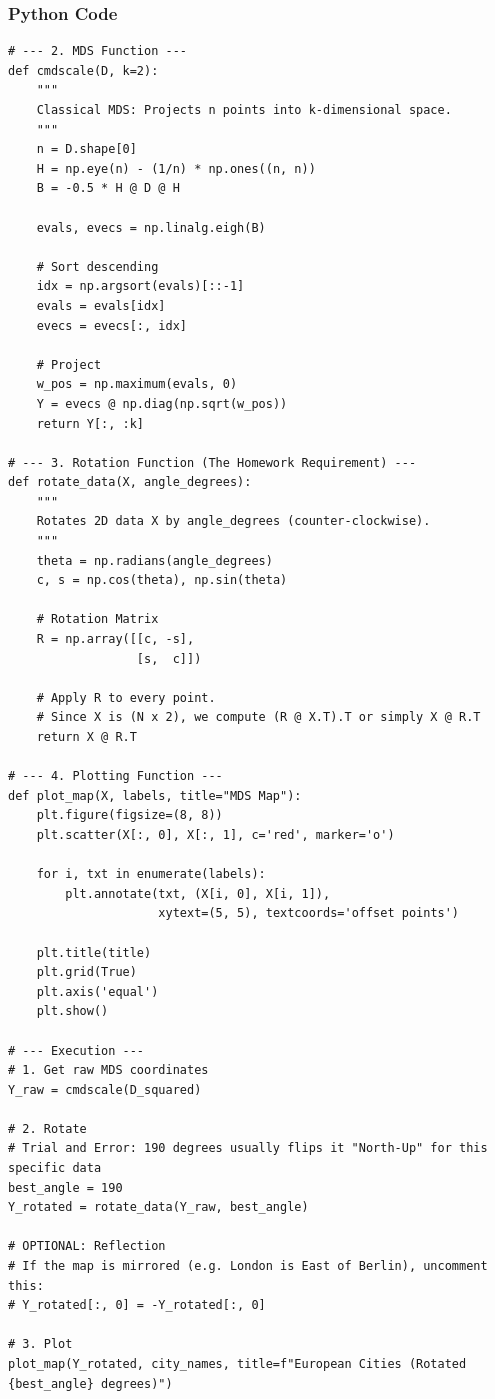 \documentclass{article}
\begin{document}
\subsubsection*{Python Code}
\begin{lstlisting}
# --- 2. MDS Function ---
def cmdscale(D, k=2):
    """
    Classical MDS: Projects n points into k-dimensional space.
    """
    n = D.shape[0]
    H = np.eye(n) - (1/n) * np.ones((n, n))
    B = -0.5 * H @ D @ H
    
    evals, evecs = np.linalg.eigh(B)
    
    # Sort descending
    idx = np.argsort(evals)[::-1]
    evals = evals[idx]
    evecs = evecs[:, idx]
    
    # Project
    w_pos = np.maximum(evals, 0)
    Y = evecs @ np.diag(np.sqrt(w_pos))
    return Y[:, :k]

# --- 3. Rotation Function (The Homework Requirement) ---
def rotate_data(X, angle_degrees):
    """
    Rotates 2D data X by angle_degrees (counter-clockwise).
    """
    theta = np.radians(angle_degrees)
    c, s = np.cos(theta), np.sin(theta)
    
    # Rotation Matrix
    R = np.array([[c, -s], 
                  [s,  c]])
    
    # Apply R to every point. 
    # Since X is (N x 2), we compute (R @ X.T).T or simply X @ R.T
    return X @ R.T

# --- 4. Plotting Function ---
def plot_map(X, labels, title="MDS Map"):
    plt.figure(figsize=(8, 8))
    plt.scatter(X[:, 0], X[:, 1], c='red', marker='o')
    
    for i, txt in enumerate(labels):
        plt.annotate(txt, (X[i, 0], X[i, 1]), 
                     xytext=(5, 5), textcoords='offset points')
        
    plt.title(title)
    plt.grid(True)
    plt.axis('equal')
    plt.show()

# --- Execution ---
# 1. Get raw MDS coordinates
Y_raw = cmdscale(D_squared)

# 2. Rotate
# Trial and Error: 190 degrees usually flips it "North-Up" for this specific data
best_angle = 190 
Y_rotated = rotate_data(Y_raw, best_angle)

# OPTIONAL: Reflection
# If the map is mirrored (e.g. London is East of Berlin), uncomment this:
# Y_rotated[:, 0] = -Y_rotated[:, 0] 

# 3. Plot
plot_map(Y_rotated, city_names, title=f"European Cities (Rotated {best_angle} degrees)")
\end{lstlisting}
\end{document}
